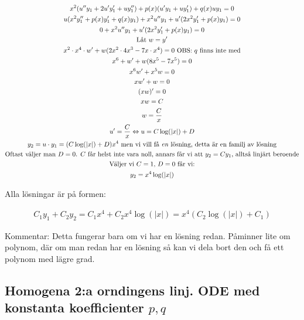 \begin{equation*}
  \begin{gathered}
    x^2(u^{\prime\prime}y_1+2u^{\prime}y_{1}^{\prime}+uy_{1}^{\prime\prime})+p(x)(u^{\prime}y_1+uy_{1}^{\prime})+q(x)uy_1=0\\
    u(x^2y_{1}^{\prime\prime}+p(x)y_{1}^{\prime}+q(x)y_{1})+x^2u^{\prime\prime}y_1+u^{\prime}(2x^2y_{1}^{\prime}+p(x)y_1)=0\\
    0+x^2u^{\prime\prime}y_1+u^{\prime}(2x^2y_{1}^{\prime}+p(x)y_1)=0\\
    \text{Låt } w = y^{\prime}\\
    x^2\cdot x^4\cdot w^{\prime}+w(2x^2\cdot4x^3-7x\cdot x^4)=0 \text{ OBS: $q$ finns inte med}\\
    x^6+w^{\prime}+w(8x^5-7x^5)=0\\
    x^6w^{\prime}+x^5w=0\\
    xw^{\prime}+w=0\\
    (xw)^{\prime}=0\\
    xw=C\\
    w=\dfrac{C}{x}\\
    u^{\prime}=\dfrac{C}{x}\Leftrightarrow u=C\log(|x|)+D\\
    y_2 = u\cdot y_1 = (C\log(|x|)+D)x^4 \text{ men vi vill få \textit{en} lösning, detta är en familj av lösning}\\
    \text{Oftast väljer man $D=0$. $C$ får helst inte vara noll, annars får vi att $y_2=Cy_1$, alltså linjärt beroende}\\
     \text{Väljer vi $C=1$, $D=0$ får vi:}\\
     y_2=x^4\log(|x|)
  \end{gathered}
\end{equation*}
\par\bigskip
\noindent Alla lösningar är på formen:


\begin{equation*}
  \begin{gathered}
    C_1y_1+C_2y_2=C_1x^4+C_2x^4\log(|x|)=x^4(C_2\log(|x|)+C_1)
  \end{gathered}
\end{equation*}
\par\bigskip
\noindent Kommentar: Detta fungerar bara om vi har en lösning redan. Påminner lite om polynom, där om man redan har en lösning så kan vi dela bort den och få ett polynom med lägre grad.

\subsection{Homogena 2:a orndingens linj. ODE med konstanta koefficienter $p,q$}\hfill\\

